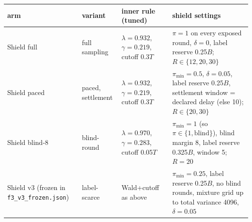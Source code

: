\begin{tabular}{@{}>{\raggedright\arraybackslash}p{3.0cm}>{\raggedright\arraybackslash}p{2.5cm}>{\raggedright\arraybackslash}p{4.2cm}>{\raggedright\arraybackslash}p{5.3cm}@{}}
\toprule
arm & variant & inner rule (tuned) & shield settings \\
\midrule
Shield full & full sampling & $\lambda=0.932$, $\gamma=0.219$, cutoff 0.3$T$ & $\pi=1$ on every exposed round, $\delta=0$, label reserve 0.25$B$; $R\in\{12,20,30\}$ \\
Shield paced & paced, settlement & $\lambda=0.932$, $\gamma=0.219$, cutoff 0.3$T$ & $\pi_{\min}=0.5$, $\delta=0.05$, label reserve 0.25$B$, settlement window = declared delay (else 10); $R\in\{20,30\}$ \\
Shield blind-8 & blind-round & $\lambda=0.970$, $\gamma=0.283$, cutoff 0.05$T$ & $\pi_{\min}=1$ (so $\pi\in\{1,\text{blind}\}$), blind margin 8, label reserve 0.325$B$, window 5; $R=20$ \\
Shield v3 (frozen in \texttt{f3\_v3\_frozen.json}) & label-scarce & Wald+cutoff as above & $\pi_{\min}=0.25$, label reserve 0.25$B$, no blind rounds, mixture grid up to total variance 4096, $\delta=0.05$ \\
\bottomrule
\end{tabular}
